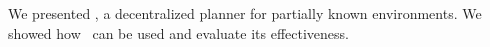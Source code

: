 We presented  \toolName, a  decentralized planner for partially known environments.
We showed how  \toolName\ can be used and evaluate its effectiveness. 

